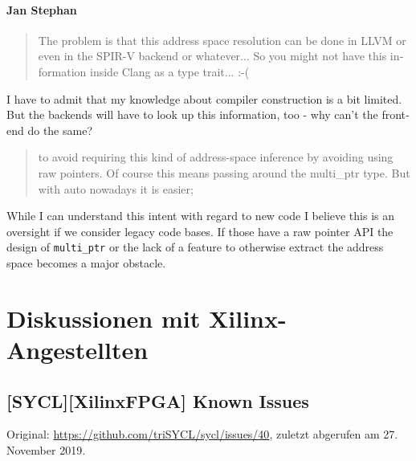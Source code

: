 \begin{otherlanguage}{english}
    \paragraph{Jan Stephan} \begin{quote}
                                The problem is that this address space
                                resolution can be done in LLVM or even in the
                                SPIR-V backend or whatever... So you might not
                                have this information inside Clang as a type
                                trait... :-(
                            \end{quote}
                            I have to admit that my knowledge about compiler
                            construction is a bit limited. But the backends will
                            have to look up this information, too - why can't
                            the frontend do the same?
                            \begin{quote}
                                to avoid requiring this kind of address-space
                                inference by avoiding using raw pointers. Of
                                course this means passing around the
                                multi\_ptr type. But with auto nowadays it is
                                easier;
                            \end{quote}
                            While I can understand this intent with regard to
                            new code I believe this is an oversight if we
                            consider legacy code bases. If those have a raw
                            pointer API the design of \texttt{multi\_ptr} or
                            the lack of a feature to otherwise extract the
                            address space becomes a major obstacle.
\end{otherlanguage}

\section{Diskussionen mit Xilinx-Angestellten}
\label{anhang:diskussionen:xilinx}

\subsection{[SYCL][XilinxFPGA] Known Issues}
\label{anhang:diskussionen:xilinx:knownissues}

Original: \url{https://github.com/triSYCL/sycl/issues/40}, zuletzt abgerufen am
27. November 2019.

